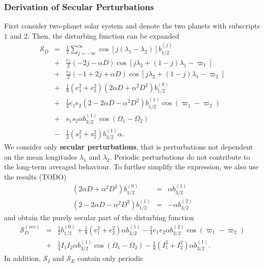\documentclass [12pt, a4paper] {article}
\begin{document}
\subsubsection{Derivation of Secular Perturbations}
First consider two-planet solar system and denote the two planets with 
subscripts $1$ and $2$. Then, the disturbing function can be expanded 
\begin {eqnarray}
    \mathcal{S}_D 
    &=& 
    \frac{1}{2}\sum_{j=-\infty}^\infty 
    \cos[j(\lambda_1 - \lambda_2)]b_{1/2}^{(j)}
    \\\nonumber 
    &+& 
    \frac{e_1}{2}
    (-2j - \alpha D)
    \cos[j\lambda_2 + (1 - j)\lambda_1 - \varpi_1]
    \\\nonumber 
    &+& 
    \frac{e_2}{2}
    (-1 + 2j + \alpha D)    
    \cos[j\lambda_2 + (1 - j)\lambda_1 - \varpi_2]
    \\\nonumber 
    &+& 
    \frac{1}{8}(e_1^2 + e_2^2)(2\alpha D + \alpha^2D^2)b_{1/2}^{(0)}
    \\\nonumber 
    &+& 
    \frac{1}{4}e_1e_2(2 - 2\alpha D - \alpha^2D^2)b_{1/2}^{(1)}
    \cos(\varpi_1 - \varpi_2)    
    \\\nonumber 
    &+& 
    s_1s_2\alpha b_{3/2}^{(1)}
    \cos(\Omega_1 - \Omega_2)
    \\\nonumber 
    &-&
    \frac{1}{2}(s_1^2 + s_2^2)b_{3/2}^{(1)}\alpha. 
\end {eqnarray}
We consider only \textbf{secular perturbations}, that is perturbations not 
dependent on the mean longitudes $\lambda_1$ and $\lambda_2$. Periodic 
perturbations do not contribute to the long-term averaged behaviour. To 
further simplify the expression, we also use the results (TODO)
\begin {eqnarray}
    (2\alpha D + \alpha^2D^2)b_{1/2}^{(0)} &=& \alpha b_{3/2}^{(1)}
    \\
    (2 - 2\alpha D - \alpha^2D^2)b_{1/2}^{(1)} &=& -\alpha b_{3/2}^{(2)}
\end {eqnarray}
and obtain the purely secular part of the disturbing function
\begin {eqnarray}
    \mathcal{S}_D^{(sec)}
    &=& 
    \frac{1}{2}b_{1/2}^{(0)}
    +
    \frac{1}{8}(e_1^2 + e_2^2)\alpha b_{3/2}^{(1)}
    - 
    \frac{1}{4}e_1e_2\alpha b_{3/2}^{(2)}\cos(\varpi_1 - \varpi_2)
    \\\nonumber 
    &+& 
    \frac{1}{4}I_1I_2\alpha b_{3/2}^{(1)}\cos(\Omega_1 - \Omega_2)
    - 
    \frac{1}{8}(I_1^2 + I_2^2)\alpha b_{3/2}^{(1)}.
\end {eqnarray}
In addition, $\mathcal{S}_I$ and $\mathcal{S}_E$ contain only periodic 
\end{document}
